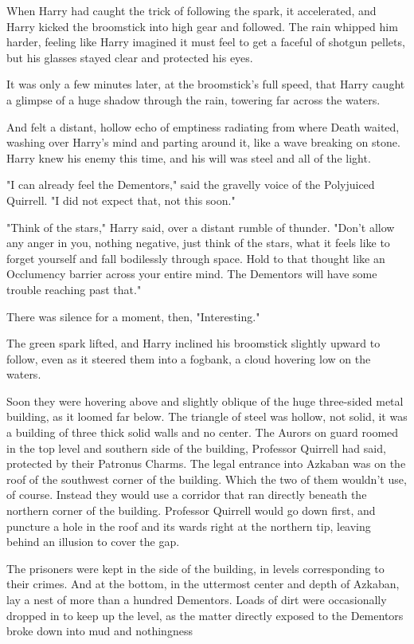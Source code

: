 When Harry had caught the trick of following the spark, it accelerated, and
Harry kicked the broomstick into high gear and followed. The rain whipped him
harder, feeling like Harry imagined it must feel to get a faceful of shotgun
pellets, but his glasses stayed clear and protected his eyes.

It was only a few minutes later, at the broomstick's full speed, that Harry
caught a glimpse of a huge shadow through the rain, towering far across the
waters.

And felt a distant, hollow echo of emptiness radiating from where Death waited,
washing over Harry's mind and parting around it, like a wave breaking on stone.
Harry knew his enemy this time, and his will was steel and all of the light.

"I can already feel the Dementors," said the gravelly voice of the Polyjuiced
Quirrell. "I did not expect that, not this soon."

"Think of the stars," Harry said, over a distant rumble of thunder. "Don't
allow any anger in you, nothing negative, just think of the stars, what it
feels like to forget yourself and fall bodilessly through space. Hold to that
thought like an Occlumency barrier across your entire mind. The Dementors will
have some trouble reaching past that."

There was silence for a moment, then, "Interesting."

The green spark lifted, and Harry inclined his broomstick slightly upward to
follow, even as it steered them into a fogbank, a cloud hovering low on the
waters.

Soon they were hovering above and slightly oblique of the huge three-sided
metal building, as it loomed far below. The triangle of steel was hollow, not
solid, it was a building of three thick solid walls and no center. The Aurors
on guard roomed in the top level and southern side of the building, Professor
Quirrell had said, protected by their Patronus Charms. The legal entrance into
Azkaban was on the roof of the southwest corner of the building. Which the two
of them wouldn't use, of course. Instead they would use a corridor that ran
directly beneath the northern corner of the building. Professor Quirrell would
go down first, and puncture a hole in the roof and its wards right at the
northern tip, leaving behind an illusion to cover the gap.

The prisoners were kept in the side of the building, in levels corresponding to
their crimes. And at the bottom, in the uttermost center and depth of Azkaban,
lay a nest of more than a hundred Dementors. Loads of dirt were occasionally
dropped in to keep up the level, as the matter directly exposed to the
Dementors broke down into mud and nothingness{\el}

